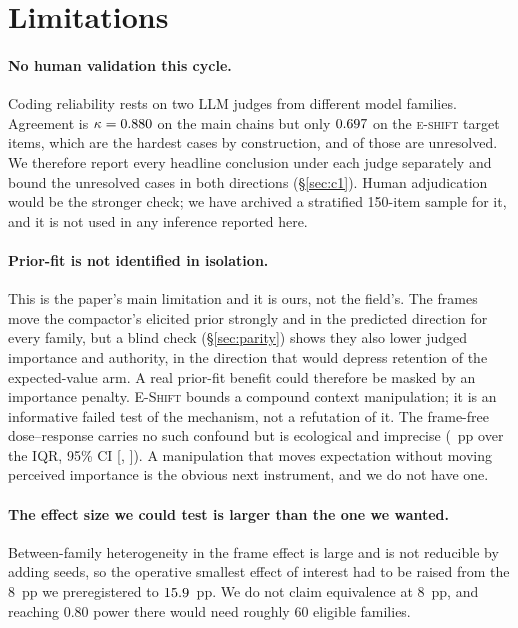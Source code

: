 \section*{Limitations}

\paragraph{No human validation this cycle.} Coding reliability rests on two LLM judges from
different model families. Agreement is $\kappa=0.880{}$ on the main chains but only
$0.697{}$ on the \textsc{e-shift} target items, which are the hardest cases by construction,
and \EShiftUnresRate{} of those are unresolved. We therefore report every headline conclusion under
each judge separately and bound the unresolved cases in both directions (\S\ref{sec:c1}). Human
adjudication would be the stronger check; we have archived a stratified 150-item sample for it, and it
is not used in any inference reported here.

\paragraph{Prior-fit is not identified in isolation.} This is the paper's main limitation and it is
ours, not the field's. The frames move the compactor's elicited prior strongly and in the predicted
direction for every family, but a blind check (\S\ref{sec:parity}) shows they also lower judged
importance and authority, in the direction that would depress retention of the expected-value arm. A
real prior-fit benefit could therefore be masked by an importance penalty. \textsc{E-Shift} bounds a
compound context manipulation; it is an informative failed test of the mechanism, not a refutation of
it. The frame-free dose--response carries no such confound but is ecological and imprecise
(\DoseIQR{}~pp over the IQR, 95\% CI [\DoseIQRlo{}, \DoseIQRhi{}]). A manipulation that moves
expectation without moving perceived importance is the obvious next instrument, and we do not have
one.

\paragraph{The effect size we could test is larger than the one we wanted.} Between-family
heterogeneity in the frame effect is large and is not reducible by adding seeds, so the operative
smallest effect of interest had to be raised from the \(8\)~pp we preregistered to
\(15.9{}\)~pp. We do not claim equivalence at \(8\)~pp, and reaching \(0.80\) power there would
need roughly \(60\) eligible families.

